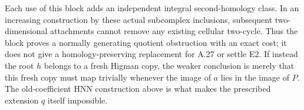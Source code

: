Each use of this block adds an independent integral second-homology
class. In an increasing construction by these actual subcomplex
inclusions, subsequent two-dimensional attachments cannot remove
any existing cellular two-cycle. Thus the block proves a normally generating quotient
obstruction with an exact cost; it does not give a homology-preserving
replacement for A.27 or settle E2. If instead the root $h$ belongs
to a fresh Higman copy, the weaker conclusion is merely that this
fresh copy must map trivially whenever the image of $a$ lies in the
image of $P$. The old-coefficient HNN construction above is what
makes the prescribed extension $q$ itself impossible.


